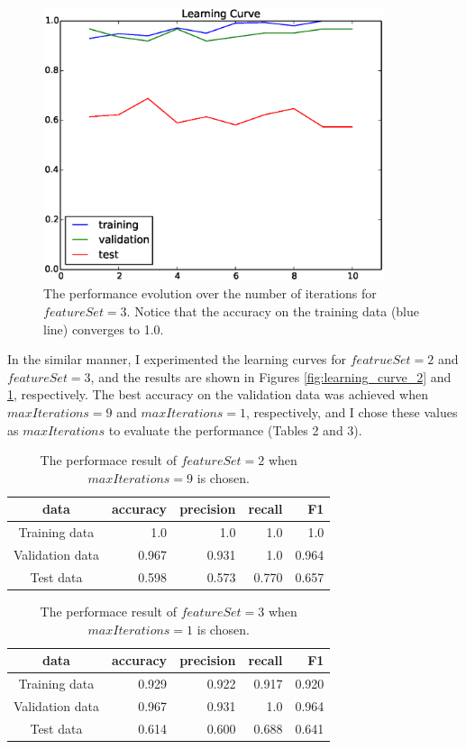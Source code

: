 \begin{figure}[htb]
\centering
\includegraphics[width=100mm]{learning_curve_3}
\caption{The performance evolution over the number of iterations for $featureSet=3$. Notice that the accuracy on the training data (blue line) converges to 1.0.}
\label{fig:learning_curve_3}
\end{figure}

In the similar manner, I experimented the learning curves for $featrueSet=2$ and $featureSet=3$, and the results are shown in Figures \ref{fig:learning_curve_2} and \ref{fig:learning_curve_3}, respectively. The best accuracy on the validation data was achieved when $maxIterations=9$ and $maxIterations=1$, respectively, and I chose these values as $maxIterations$ to evaluate the performance (Tables 2 and 3).



\begin{table}[htb]
\centering
  \begin{tabular}{|c|r|r|r|r|} \hline
    data & accuracy & precision & recall & F1 \\ \hline
    Training data & 1.0 & 1.0 & 1.0 & 1.0 \\ \hline
    Validation data & 0.967 & 0.931 & 1.0 & 0.964 \\ \hline
    Test data & 0.598 & 0.573 & 0.770 & 0.657 \\ \hline
  \end{tabular}
  \caption{The performace result of $featureSet = 2$ when $maxIterations = 9$ is chosen.}
\end{table}

\begin{table}[htb]
\centering
  \begin{tabular}{|c|r|r|r|r|} \hline
    data & accuracy & precision & recall & F1 \\ \hline
    Training data & 0.929 & 0.922 & 0.917 & 0.920 \\ \hline
    Validation data & 0.967 & 0.931 & 1.0 & 0.964 \\ \hline
    Test data & 0.614 & 0.600 & 0.688 & 0.641 \\ \hline
  \end{tabular}
  \caption{The performace result of $featureSet = 3$ when $maxIterations = 1$ is chosen.}
\end{table}

